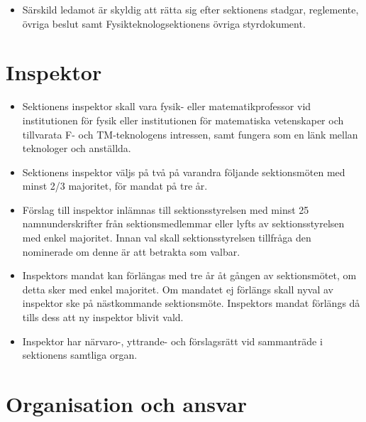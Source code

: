 \documentclass[11pt,a4paper]{article}
\begin{document}
\begin{itemize}

\item Särskild ledamot är skyldig att rätta sig efter sektionens stadgar,
   regle\-mente, övriga beslut samt Fysikteknologsektionens övriga styrdokument.


\end{itemize}

\newpage

\section{Inspektor}
\begin{itemize}

	\item Sektionens inspektor skall vara fysik- eller matematikprofessor vid institutionen för fysik eller institutionen för matematiska vetenskaper och tillvarata F- och TM-teknologens intressen, samt fungera som en länk mellan teknologer och anställda.
	
	\item Sektionens inspektor väljs på två på varandra följande sektionsmöten med minst 2/3 majoritet, för mandat på tre år. 
	
	\item Förslag till inspektor inlämnas till sektionsstyrelsen med minst 25 namnunderskrifter från sektionsmedlemmar eller lyfts av sektionsstyrelsen med enkel majoritet. Innan val skall sektionsstyrelsen tillfråga den nominerade om denne är att betrakta som valbar.
	
	\item Inspektors mandat kan förlängas med tre år åt gången av sektionsmötet, om detta sker med enkel majoritet. Om mandatet ej förlängs skall nyval av inspektor ske på nästkommande sektionsmöte. Inspektors mandat förlängs då tills dess att ny inspektor blivit vald.


\item Inspektor har närvaro-, yttrande- och förslagsrätt vid sammanträde i sektionens samtliga organ.

\end{itemize}



\section{Organisation och ansvar}
\end{document}
